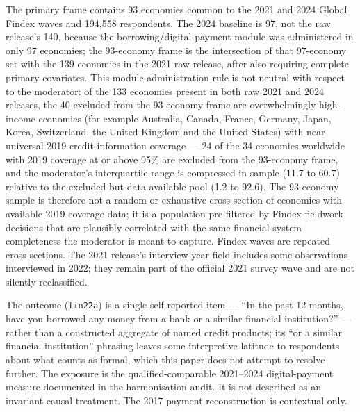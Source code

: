 The primary frame contains 93 economies common to the 2021 and 2024 Global Findex waves
\citep{WorldBankFindexMicrodata2025,DemirgucKuntKlapperSingerAnsar2022,KlapperSingerStaritaNorris2025}
and 194,558 respondents. The 2024 baseline is 97, not the raw release's 140, because the
borrowing/digital-payment module was administered in only 97 economies; the 93-economy
frame is the intersection of that 97-economy set with the 139 economies in the 2021 raw
release, after also requiring complete primary covariates. This module-administration rule
is not neutral with respect to the moderator: of the 133 economies present in both raw 2021
and 2024 releases, the 40 excluded from the 93-economy frame are overwhelmingly high-income
economies (for example Australia, Canada, France, Germany, Japan, Korea, Switzerland, the
United Kingdom and the United States) with near-universal 2019 credit-information coverage
--- 24 of the 34 economies worldwide with 2019 coverage at or above 95\% are excluded from
the 93-economy frame, and the moderator's interquartile range is compressed in-sample (11.7
to 60.7) relative to the excluded-but-data-available pool (1.2 to 92.6). The 93-economy
sample is therefore not a random or exhaustive cross-section of economies with available
2019 coverage data; it is a population pre-filtered by Findex fieldwork decisions that are
plausibly correlated with the same financial-system completeness the moderator is meant to
capture. Findex waves are repeated cross-sections. The 2021 release's interview-year field
includes some observations interviewed in 2022; they remain part of the official 2021
survey wave and are not silently reclassified.

The outcome (\texttt{fin22a}) is a single self-reported item --- ``In the past 12 months,
have you borrowed any money from a bank or a similar financial institution?'' --- rather
than a constructed aggregate of named credit products; its ``or a similar financial
institution'' phrasing leaves some interpretive latitude to respondents about what counts
as formal, which this paper does not attempt to resolve further. The exposure is the
qualified-comparable 2021--2024 digital-payment measure documented in the harmonisation
audit. It is not described as an invariant causal treatment. The 2017 payment
reconstruction is contextual only.


